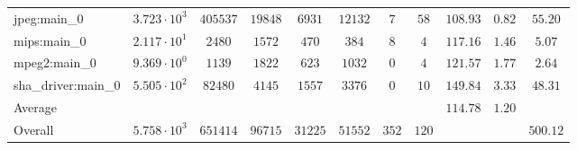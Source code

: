 \begin{tabular}{|l|c|c|c|c|c|c|c|c|c|c|}
jpeg:main\_0            & $ 3.723 \cdot 10^{3}  $ & $ 405537 $ & $ 19848 $ & $ 6931  $ & $ 12132 $ & $ 7   $ & $ 58  $ & $ 108.93      $ & $ 0.82    $ & $ 55.20   $ \\
mips:main\_0            & $ 2.117 \cdot 10^{1}  $ & $ 2480   $ & $ 1572  $ & $ 470   $ & $ 384   $ & $ 8   $ & $ 4   $ & $ 117.16      $ & $ 1.46    $ & $ 5.07    $ \\
mpeg2:main\_0           & $ 9.369 \cdot 10^{0}  $ & $ 1139   $ & $ 1822  $ & $ 623   $ & $ 1032  $ & $ 0   $ & $ 4   $ & $ 121.57      $ & $ 1.77    $ & $ 2.64    $ \\
sha\_driver:main\_0     & $ 5.505 \cdot 10^{2}  $ & $ 82480  $ & $ 4145  $ & $ 1557  $ & $ 3376  $ & $ 0   $ & $ 10  $ & $ 149.84      $ & $ 3.33    $ & $ 48.31   $ \\
\hline
Average                 & $                     $ & $        $ & $       $ & $       $ & $       $ & $     $ & $     $ & $ 114.78      $ & $ 1.20    $ & $         $ \\
\hline
Overall                 & $ 5.758 \cdot 10^{3}  $ & $ 651414 $ & $ 96715 $ & $ 31225 $ & $ 51552 $ & $ 352 $ & $ 120 $ & $             $ & $         $ & $ 500.12  $ \\
\hline
\end{tabular}
